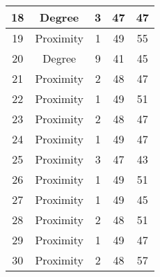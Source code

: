 \documentclass[results.tex]{subfiles}
\begin{document}
\begin{center}
\begin{tabular}{| c || c | c | c | c |}
            \hline
            18                      & Degree                       & 3                      & 47                      & 47                   \\
            \hline
            19                      & Proximity                    & 1                      & 49                      & 55                   \\
            \hline
            20                      & Degree                       & 9                      & 41                      & 45                   \\
            \hline
            21                      & Proximity                    & 2                      & 48                      & 47                   \\
            \hline
            22                      & Proximity                    & 1                      & 49                      & 51                   \\
            \hline
            23                      & Proximity                    & 2                      & 48                      & 47                   \\
            \hline
            24                      & Proximity                    & 1                      & 49                      & 47                   \\
            \hline
            25                      & Proximity                    & 3                      & 47                      & 43                   \\
            \hline
            26                      & Proximity                    & 1                      & 49                      & 51                   \\
            \hline
            27                      & Proximity                    & 1                      & 49                      & 45                   \\
            \hline
            28                      & Proximity                    & 2                      & 48                      & 51                   \\
            \hline
            29                      & Proximity                    & 1                      & 49                      & 47                   \\
            \hline
            30                      & Proximity                    & 2                      & 48                      & 57                   \\

\end{tabular}
\end{center}
\end{document}

